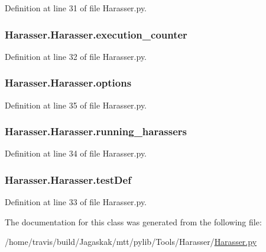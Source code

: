 Definition at line 31 of file Harasser.\-py.

\hypertarget{classHarasser_1_1Harasser_a96c7c91ef5d33784056c567ba49a2c8a}{
\subsubsection[{execution\-\_\-counter}]{\setlength{\rightskip}{0pt plus 5cm}Harasser.\-Harasser.\-execution\-\_\-counter}}\label{classHarasser_1_1Harasser_a96c7c91ef5d33784056c567ba49a2c8a}


Definition at line 32 of file Harasser.\-py.

\hypertarget{classHarasser_1_1Harasser_ab9ed73d71cdaae7d9b5cc81548823527}{
\subsubsection[{options}]{\setlength{\rightskip}{0pt plus 5cm}Harasser.\-Harasser.\-options}}\label{classHarasser_1_1Harasser_ab9ed73d71cdaae7d9b5cc81548823527}


Definition at line 35 of file Harasser.\-py.

\hypertarget{classHarasser_1_1Harasser_ad9d37d39c99222e899af613a573ecd15}{
\subsubsection[{running\-\_\-harassers}]{\setlength{\rightskip}{0pt plus 5cm}Harasser.\-Harasser.\-running\-\_\-harassers}}\label{classHarasser_1_1Harasser_ad9d37d39c99222e899af613a573ecd15}


Definition at line 34 of file Harasser.\-py.

\hypertarget{classHarasser_1_1Harasser_adddf34aabbc91934437e1a30134224c3}{
\subsubsection[{test\-Def}]{\setlength{\rightskip}{0pt plus 5cm}Harasser.\-Harasser.\-test\-Def}}\label{classHarasser_1_1Harasser_adddf34aabbc91934437e1a30134224c3}


Definition at line 33 of file Harasser.\-py.



The documentation for this class was generated from the following file\-:\begin{DoxyCompactItemize}
\item 
/home/travis/build/\-Jagaskak/mtt/pylib/\-Tools/\-Harasser/\hyperlink{Harasser_8py}{Harasser.\-py}\end{DoxyCompactItemize}
